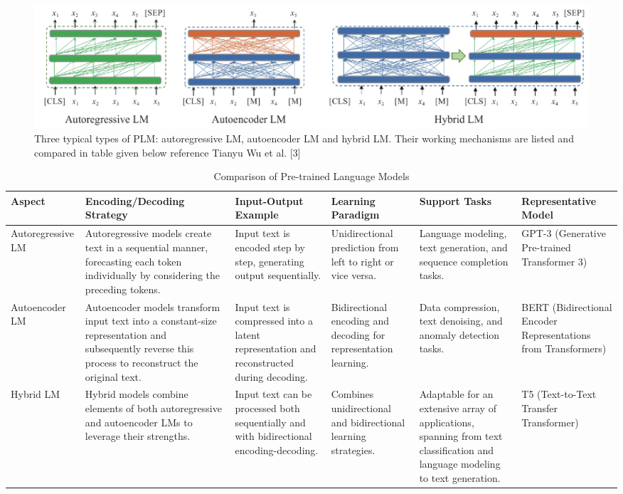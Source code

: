 \documentclass[conference]{IEEEtran}
\begin{document}
\begin{figure}
    \centering
    \includegraphics[width=\textwidth]{LMTYPES}
    \caption{Three typical types of PLM: autoregressive LM, autoencoder LM and hybrid LM. Their working mechanisms are listed and compared in
table given below reference Tianyu Wu et al. [3]}
    \label{fig:your_image_label}
\end{figure}


\begin{table}
    \centering
    \caption{Comparison of Pre-trained Language Models}
    \begin{tabular}{|p{2cm}|p{3cm}|p{3cm}|p{2cm}|p{2cm}|p{2 cm}|}
        \hline
\center
        \textbf{Aspect} & \textbf{Encoding/Decoding Strategy} & \textbf{Input-Output Example} & \textbf{Learning Paradigm} & \textbf{Support Tasks} & \textbf{Representative Model} \\
        \hline
\center
        Autoregressive LM & Autoregressive models create text in a sequential manner, forecasting each token individually by considering the preceding tokens. & Input text is encoded step by step, generating output sequentially. & Unidirectional prediction from left to right or vice versa. & Language modeling, text generation, and sequence completion tasks. & GPT-3 (Generative Pre-trained Transformer 3) \\
        \hline
\center
        Autoencoder LM & Autoencoder models transform input text into a constant-size representation and subsequently reverse this process to reconstruct the original text. & Input text is compressed into a latent representation and reconstructed during decoding. & Bidirectional encoding and decoding for representation learning. & Data compression, text denoising, and anomaly detection tasks. & BERT (Bidirectional Encoder Representations from Transformers) \\
        \hline
\center
        Hybrid LM & Hybrid models combine elements of both autoregressive and autoencoder LMs to leverage their strengths. & Input text can be processed both sequentially and with bidirectional encoding-decoding. & Combines unidirectional and bidirectional learning strategies. & Adaptable for an extensive array of applications, spanning from text classification and language modeling to text generation. & T5 (Text-to-Text Transfer Transformer) \\
        \hline
    \end{tabular}
\end{table}
\end{document}
